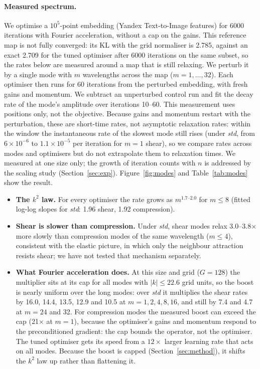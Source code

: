\documentclass[11pt]{article}
\begin{document}
\paragraph{Measured spectrum.} We optimise a $10^5$-point embedding (Yandex Text-to-Image features) for 6000
iterations with Fourier acceleration, without a cap on the gains. This reference map is not fully converged: its KL
with the grid normaliser is 2.785, against an exact 2.709 for the tuned optimiser after 6000 iterations on the
same subset, so the rates below are measured around a map that is still relaxing. We perturb it by a single mode with $m$ wavelengths across the map ($m=1,\dots,32$). Each
optimiser then runs for 60 iterations from the perturbed embedding, with fresh gains and momentum. We
subtract an unperturbed control run and fit the decay rate of the mode's amplitude over iterations 10--60.
This measurement uses positions only, not the objective. Because gains and momentum restart with the
perturbation, these are short-time rates, not asymptotic relaxation rates: within the window the instantaneous
rate of the slowest mode still rises (under \emph{std}, from $6\times10^{-6}$ to $1.1\times10^{-5}$ per iteration
for $m=1$ shear), so we compare rates across modes and optimisers but do not extrapolate them to relaxation
times. We measured at one size only; the growth of iteration counts with $n$ is addressed by the scaling study
(Section~\ref{sec:exp}). Figure~\ref{fig:modes} and Table~\ref{tab:modes} show the result.
\begin{itemize}
\item \textbf{The $k^2$ law.} For every optimiser the rate grows as $m^{1.7\text{--}2.0}$ for $m\le8$ (fitted
log-log slopes for \emph{std}: 1.96 shear, 1.92 compression).
\item \textbf{Shear is slower than compression.} Under \emph{std}, shear modes relax 3.0--3.8$\times$ more
slowly than compression modes of the same wavelength ($m\le4$), consistent with the elastic picture, in which
only the neighbour attraction resists shear; we have not tested that mechanism separately.
\item \textbf{What Fourier acceleration does.} At this size and grid ($G=128$) the multiplier sits at its cap for
all modes with $|k|\le22.6$ grid units, so the boost is nearly uniform over the long modes: over \emph{std} it
multiplies the shear rates by 16.0, 14.4, 13.5, 12.9 and 10.5 at $m=1,2,4,8,16$, and still by 7.4 and 4.7 at
$m=24$ and 32. For compression modes the measured boost can exceed the cap (21$\times$ at $m=1$), because the
optimiser's gains and momentum respond to the preconditioned gradient: the cap bounds the operator, not the
optimiser. The tuned optimiser gets its speed from a $12\times$ larger learning rate that acts on all modes.
Because the boost is capped (Section~\ref{sec:method}), it shifts the $k^2$ law up rather than flattening it.
\end{itemize}
\end{document}
